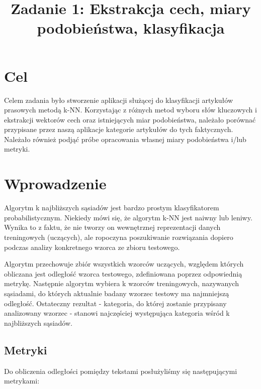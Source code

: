 \documentclass{classrep}
\author{
\studentinfo{Mateusz Walczak}{216911} \and
\studentinfo{Konrad Kajszczak}{216790}
}
\title{Zadanie 1: Ekstrakcja cech, miary podobieństwa, klasyfikacja}
\begin{document}
\maketitle

\section{Cel}
{Celem zadania było stworzenie aplikacji służącej do klasyfikacji artykułów prasowych metodą k-NN. Korzystając z różnych metod
wyboru słów kluczowych i ekstrakcji wektorów cech oraz istniejących miar podobieństwa, należało porównać przypisane przez naszą aplikacje kategorie artykułów do tych faktycznych. Należało również podjąć próbe opracowania własnej miary podobieństwa i/lub metryki.}

\section{Wprowadzenie}
Algorytm k najbliższych sąsiadów jest bardzo prostym klasyfikatorem probabilistycznym. Niekiedy mówi się, że algorytm k-NN jest naiwny lub leniwy. Wynika to z faktu, że nie tworzy on wewnętrznej reprezentacji danych treningowych (uczących), ale ropoczyna poszukiwanie rozwiązania dopiero podczas analizy konkretnego wzorca ze zbioru testowego. \newline

Algorytm przechowuje zbiór wszystkich wzorców uczących, względem których obliczana jest odległość wzorca testowego, zdefiniowana poprzez odpowiednią metrykę. Następnie algorytm wybiera k wzorców treningowych, nazywanych sąsiadami, do których aktualnie badany wzorzec testowy ma najmniejszą odległość. Ostateczny rezultat - kategoria, do której zostanie przypisany analizowany wzorzec - stanowi najczęściej występująca kategoria wśród k najbliższych sąsiadów.

\subsection{Metryki}

Do obliczenia odległości pomiędzy tekstami posłużyliśmy się następującymi metrykami:
\end{document}
